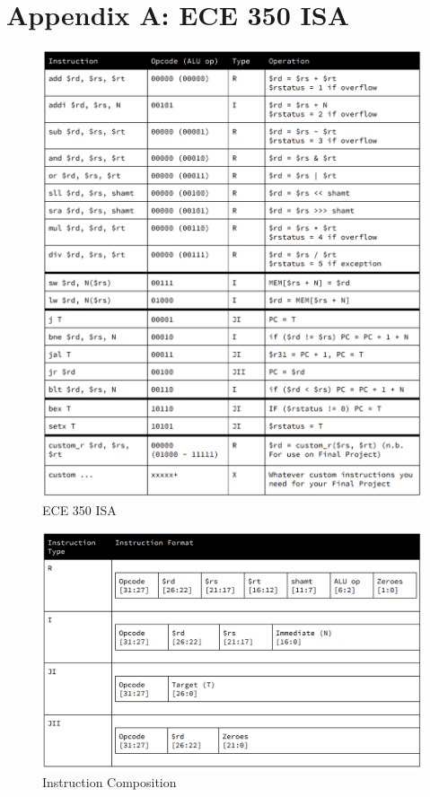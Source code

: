\documentclass[letterpaper]{article} %
\begin{document}
\section*{Appendix A: ECE 350 ISA}
\begin{figure}[H]
\centering
\hspace*{-1cm} 
\includegraphics{ISA.PNG}
\caption{ECE 350 ISA}
\end{figure}

\begin{figure}[H]
\centering
\hspace*{-1cm} 
\includegraphics{TYPE.PNG}
\caption{Instruction Composition}
\end{figure}
\end{document}
